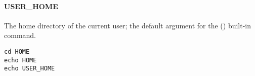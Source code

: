 \label{par:user_home}
\paragraph{USER\_HOME}

The home directory of the current user; the default argument for
the  
() built-in command.

\begin{lstlisting}[style=Groovybash, label={lst:example_user_home}]
cd HOME
echo HOME
echo USER_HOME
\end{lstlisting}

